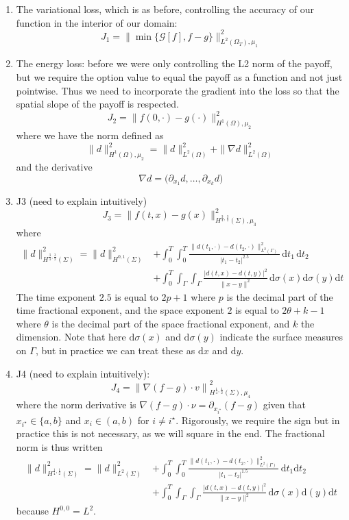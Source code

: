 \begin{enumerate}
    \item The variational loss, which is as before, controlling the accuracy of our function in the interior of our domain:
    \[J_1 = \|\min \{\mathcal G[f], f-g\}\|^2_{L^2(\Omega_T), \mu_1}\]
    \item The energy loss: before we were only controlling the L2 norm of the payoff, but we require the option value to equal the payoff as a function and not just pointwise. Thus we need to incorporate the gradient into the loss so that the spatial slope of the payoff is respected.
    \[J_2 = \|f(0, \cdot) - g(\cdot) \|^2_{H^1(\Omega), \mu_2}\]
    where we have the norm defined as
    \[\|d\|^2_{H^1(\Omega), \mu_2} = \|d\|^2_{L^2(\Omega)} + \|\nabla d\|^2_{L^2(\Omega)}\]
    and the derivative
    \[\nabla d = \big(\partial_{x_1}d, \dots, \partial_{x_k}d\big)\]
    \item J3 (need to explain intuitively)
    \[J_3 =\|f(t, x) - g( x)\|^2_{H^{\frac 34, \frac 32}(\Sigma), \mu_3}\]
    where
    \begin{align*}
        \|d\|^2_{H^{\frac 34, \frac 32}(\Sigma)} = \|d\|^2_{H^{0,1}(\Sigma)} &+ \int_0^T\int_0^T\frac{\|d(t_1, \cdot) - d(t_2, \cdot)\|^2_{L^2(\Gamma)}}{|t_1-t_2|^{2.5}}\,\mathrm dt_1\,\mathrm dt_2 \\ &+ \int_0^T\int_\Gamma\int_\Gamma \frac{|d(t, x) - d(t, y)|^2}{\|x-y\|^{2}}\,\mathrm d\sigma(x)\mathrm d\sigma(y) \mathrm dt
    \end{align*}
    The time exponent $2.5$ is equal to $2p+1$ where $p$ is the decimal part of the time fractional exponent, and the space exponent $2$ is equal to $2\theta + k - 1$ where $\theta$ is the decimal part of the space fractional exponent, and $k$ the dimension. Note that here $\mathrm d \sigma(x)$ and $\mathrm d \sigma(y)$ indicate the surface measures on $\Gamma$, but in practice we can treat these as $\mathrm dx$ and $\mathrm dy$.
    \item J4 (need to explain intuitively):
    \[J_4 =\left\|\nabla (f-g) \cdot v\right\|^2_{H^{\frac 14, \frac 12}(\Sigma), \mu_4}\]
    where the norm derivative is $\nabla(f-g)\cdot \nu = \partial_{x_{i^\star}}(f-g)$ given that $x_{i^\star} \in \{a, b\}$ and $x_{i} \in (a, b)$ for $i \ne i^\star$. Rigorously, we require the sign but in practice this is not necessary, as we will square in the end. The fractional norm is thus written
    \begin{align*}
        \|d\|^2_{H^{\frac 14, \frac 12}(\Sigma)} = \|d\|^2_{L^2(\Sigma)} &+ \int_0^T\int_0^T \frac{\|d(t_1, \cdot) - d(t_2, \cdot)\|^2_{L^2(\Gamma)}}{|t_1-t_2|^{1.5}}\,\mathrm dt_1\mathrm dt_2 \\ &+ \int_{0}^T\int_\Gamma\int_\Gamma \frac{|d(t, x) - d(t, y)|^2}{\|x-y\|^2}\,\mathrm d\sigma(x)\mathrm d(y)\mathrm dt
    \end{align*}
    because $H^{0, 0} = L^2$.
    
\end{enumerate}

